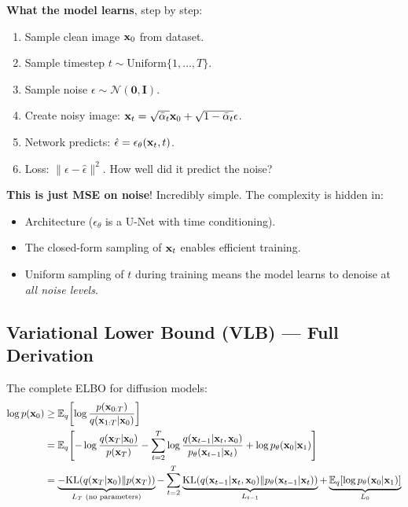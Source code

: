 \begin{keybox}
\textbf{What the model learns}, step by step:
\begin{enumerate}
\item Sample clean image $\mathbf{x}_0$ from dataset.
\item Sample timestep $t \sim \text{Uniform}\{1,\ldots,T\}$.
\item Sample noise $\epsilon \sim \mathcal{N}(\mathbf{0}, \mathbf{I})$.
\item Create noisy image: $\mathbf{x}_t = \sqrt{\bar\alpha_t}\mathbf{x}_0 + \sqrt{1-\bar\alpha_t}\epsilon$.
\item Network predicts: $\hat\epsilon = \epsilon_\theta(\mathbf{x}_t, t)$.
\item Loss: $\|\epsilon - \hat\epsilon\|^2$. How well did it predict the noise?
\end{enumerate}

\textbf{This is just MSE on noise}! Incredibly simple. The complexity is hidden in:
\begin{itemize}
\item Architecture ($\epsilon_\theta$ is a U-Net with time conditioning).
\item The closed-form sampling of $\mathbf{x}_t$ enables efficient training.
\item Uniform sampling of $t$ during training means the model learns to denoise at \emph{all noise levels}.
\end{itemize}
\end{keybox}

\subsection{Variational Lower Bound (VLB) — Full Derivation}

The complete ELBO for diffusion models:
\begin{align}
\log p(\mathbf{x}_0) &\geq \mathbb{E}_q\!\left[\log\frac{p(\mathbf{x}_{0:T})}{q(\mathbf{x}_{1:T}|\mathbf{x}_0)}\right] \nonumber\\
&= \mathbb{E}_q\!\left[-\log\frac{q(\mathbf{x}_T|\mathbf{x}_0)}{p(\mathbf{x}_T)} - \sum_{t=2}^T\log\frac{q(\mathbf{x}_{t-1}|\mathbf{x}_t,\mathbf{x}_0)}{p_\theta(\mathbf{x}_{t-1}|\mathbf{x}_t)} + \log p_\theta(\mathbf{x}_0|\mathbf{x}_1)\right] \nonumber\\
&= \underbrace{-\text{KL}(q(\mathbf{x}_T|\mathbf{x}_0)\|p(\mathbf{x}_T))}_{L_T\text{ (no parameters)}} - \sum_{t=2}^T\underbrace{\text{KL}(q(\mathbf{x}_{t-1}|\mathbf{x}_t,\mathbf{x}_0)\|p_\theta(\mathbf{x}_{t-1}|\mathbf{x}_t))}_{L_{t-1}} + \underbrace{\mathbb{E}_q[\log p_\theta(\mathbf{x}_0|\mathbf{x}_1)]}_{L_0}
\end{align}

